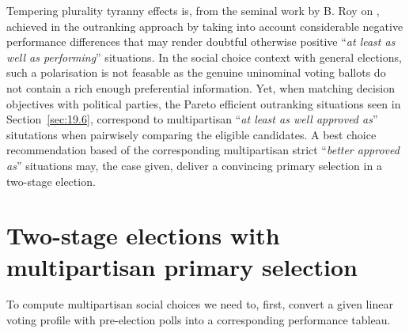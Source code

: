 Tempering plurality tyranny effects is, from the seminal work by B. Roy on \citep{ROY-1966}, achieved in the outranking approach by taking into account considerable negative performance differences that may render doubtful otherwise positive ``\emph{at least as well as performing}'' situations. In the social choice context with general elections, such a polarisation is not feasable as the genuine uninominal voting ballots do not contain a rich enough preferential information. Yet, when matching decision objectives with political parties, the Pareto efficient outranking situations seen in Section~\ref{sec:19.6}, correspond to multipartisan ``\emph{at least as well approved as}'' situtations when pairwisely comparing the eligible candidates. A best choice recommendation based of the corresponding multipartisan strict ``\emph{better approved as}'' situations may, the case given, deliver a convincing primary selection in a two-stage election. 

\section{Two-stage elections with multipartisan primary selection}
\label{sec:20.1}

To compute multipartisan social choices we need to, first, convert a given linear voting profile with pre-election polls into a corresponding performance tableau.


